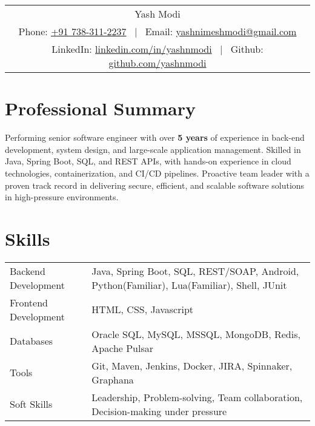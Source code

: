 \documentclass[a4paper,10.5pt]{article}
\begin{document}
\pagestyle{plain} 



\begin{tabularx}{\linewidth}{@{} C @{}}
\Huge{Yash Modi} \\[7pt]
Phone: \href{tel:+917383112237}{+91 738-311-2237} \ $|$ \ 
Email: \href{mailto:yashnimeshmodi@gmail.com}{yashnimeshmodi@gmail.com} \\
LinkedIn: \href{https://linkedin.com/in/yashnmodi}{linkedin.com/in/yashnmodi} \ $|$ \ 
Github: \href{https://github.com/yashnmodi}{github.com/yashnmodi} \\
\end{tabularx}

\section{Professional Summary}
Performing senior software engineer with over \textbf{5 years} of experience in back-end development, system design, and large-scale application management. Skilled in Java, Spring Boot, SQL, and REST APIs, with hands-on experience in cloud technologies, containerization, and CI/CD pipelines. Proactive team leader with a proven track record in delivering secure, efficient, and scalable software solutions in high-pressure environments.

\section{Skills}
\begin{tabularx}{\linewidth}{@{}l X@{}}
Backend Development & \normalsize{Java, Spring Boot, SQL, REST/SOAP, Android, Python(Familiar), Lua(Familiar), Shell, JUnit}\\
Frontend Development & \normalsize{HTML, CSS, Javascript}\\
Databases & \normalsize{Oracle SQL, MySQL, MSSQL, MongoDB, Redis, Apache Pulsar}\\
Tools & \normalsize{Git, Maven, Jenkins, Docker, JIRA, Spinnaker, Graphana}\\
Soft Skills & \normalsize{Leadership, Problem-solving, Team collaboration, Decision-making under pressure}\\
\end{tabularx}
\end{document}
